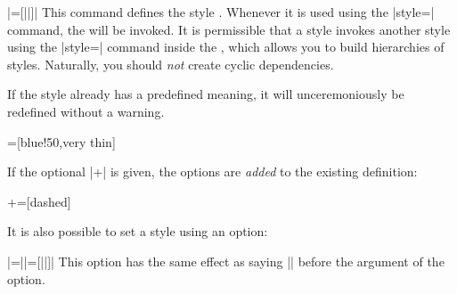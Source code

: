 \begin{command}{\tikzstyle{}\opt{|+|}|=[||]|}
  This command defines the style . Whenever it is
  used using the |style=| command, the 
  will be invoked. It is permissible that a style invokes another
  style using the |style=| command inside the , which
  allows you to build hierarchies of styles. Naturally, you should
  \emph{not} create cyclic dependencies.

  If the style already has a predefined meaning, it will
  unceremoniously be redefined without a warning.
\begin{codeexample}[]
=[blue!50,very thin]
\end{codeexample}

  If the optional |+| is given, the options are \emph{added} to the
  existing definition:
\begin{codeexample}[]
+=[dashed]%
\end{codeexample}
\end{command}

It is also possible to set a style using an option:
\begin{itemize}
  |={|\opt{|+|}|=[||]}|
  This option has the same effect as saying |\tikzstyle| before the
  argument of the option. 
\begin{codeexample}[]
\end{codeexample}
\end{itemize}


